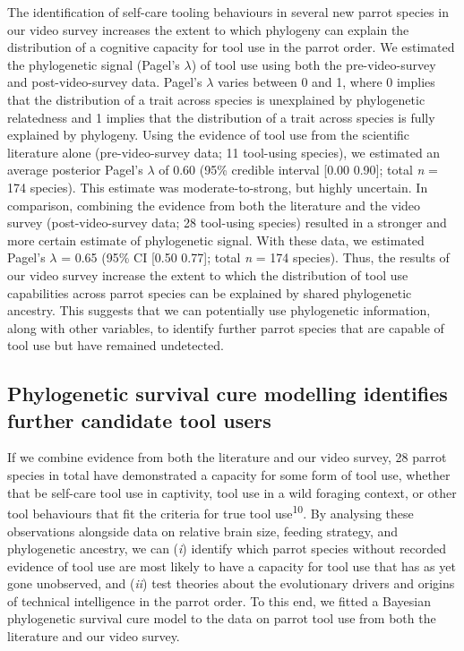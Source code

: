 \documentclass[
  man, donotrepeattitle,floatsintext]{apa6}
\begin{document}
The identification of self-care tooling behaviours in several new parrot species
in our video survey increases the extent to which phylogeny can explain the
distribution of a cognitive capacity for tool use in the parrot order. We
estimated the phylogenetic signal (Pagel's \(\lambda\)) of tool use using both the
pre-video-survey and post-video-survey data. Pagel's \(\lambda\) varies between 0
and 1, where 0 implies that the distribution of a trait across species is
unexplained by phylogenetic relatedness and 1 implies that the distribution of a
trait across species is fully explained by phylogeny. Using the evidence of tool
use from the scientific literature alone (pre-video-survey data; 11 tool-using
species), we estimated an average posterior Pagel's \(\lambda\) of
0.60 (95\% credible interval {[}0.00
0.90{]}; total \emph{n} =
174 species). This estimate was moderate-to-strong, but highly
uncertain. In comparison, combining the evidence from both the literature and
the video survey (post-video-survey data; 28 tool-using species) resulted in a
stronger and more certain estimate of phylogenetic signal. With these data, we
estimated Pagel's \(\lambda\) = 0.65 (95\% CI
{[}0.50
0.77{]}; total \emph{n} =
174 species). Thus, the results of our video survey increase
the extent to which the distribution of tool use capabilities across parrot
species can be explained by shared phylogenetic ancestry. This suggests that we
can potentially use phylogenetic information, along with other variables, to
identify further parrot species that are capable of tool use but have remained
undetected.

\hypertarget{phylogenetic-survival-cure-modelling-identifies-further-candidate-tool-users}{%
\subsection{Phylogenetic survival cure modelling identifies further candidate tool users}\label{phylogenetic-survival-cure-modelling-identifies-further-candidate-tool-users}}

If we combine evidence from both the literature and our video survey, 28 parrot
species in total have demonstrated a capacity for some form of tool use, whether
that be self-care tool use in captivity, tool use in a wild foraging context, or
other tool behaviours that fit the criteria for true tool use\textsuperscript{10}.
By analysing these observations alongside data on relative brain size, feeding
strategy, and phylogenetic ancestry, we can (\emph{i}) identify which parrot species
without recorded evidence of tool use are most likely to have a capacity for
tool use that has as yet gone unobserved, and (\emph{ii}) test theories about the
evolutionary drivers and origins of technical intelligence in the parrot order.
To this end, we fitted a Bayesian phylogenetic survival cure model to the data
on parrot tool use from both the literature and our video survey.
\end{document}
